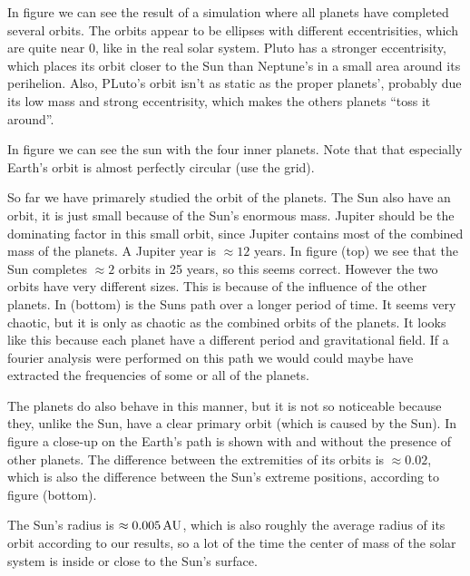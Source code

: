 
In figure  we can see the result of a simulation where all planets have completed several orbits. The orbits appear to be ellipses with different eccentrisities, which are quite near $0$, like in the real solar system. Pluto has a stronger eccentrisity, which places its orbit closer to the Sun than Neptune's in a small area around its perihelion. Also, PLuto's orbit isn't as static as the proper planets', probably due its low mass and strong eccentrisity, which makes the others planets ``toss it around''.


In figure  we can see the sun with the four inner planets. Note that that especially Earth's orbit is almost perfectly circular (use the grid).


So far we have primarely studied the orbit of the planets. The Sun also have an orbit, it is just small because of the Sun's enormous mass. Jupiter should be the dominating factor in this small orbit, since Jupiter contains most of the combined mass of the planets. A Jupiter year is $\approx 12$ years. In figure (top) we see that the Sun completes $\approx 2$ orbits in 25 years, so this seems correct. However the two orbits have very different sizes. This is because of the influence of the other planets. In (bottom) is the Suns path over a longer period of time. It seems very chaotic, but it is only as chaotic as the combined orbits of the planets. It looks like this because each planet have a different period and gravitational field. If a fourier analysis were performed on this path we would could maybe have extracted the frequencies of some or all of the planets.

The planets do also behave in this manner,  but it is not so noticeable because they, unlike the Sun, have a clear primary orbit (which is caused by the Sun). In figure  a close-up on the Earth's path is shown with and without the presence of other planets. The difference between the extremities of its orbits is $\approx 0.02$, which is also the difference between the Sun's extreme positions, according to figure (bottom).

The Sun's radius is $\approx 0.005 \, \textrm{AU}$, which is also roughly the average radius of its orbit according to our results, so a lot of the time the center of mass of the solar system is inside or close to the Sun's surface.
